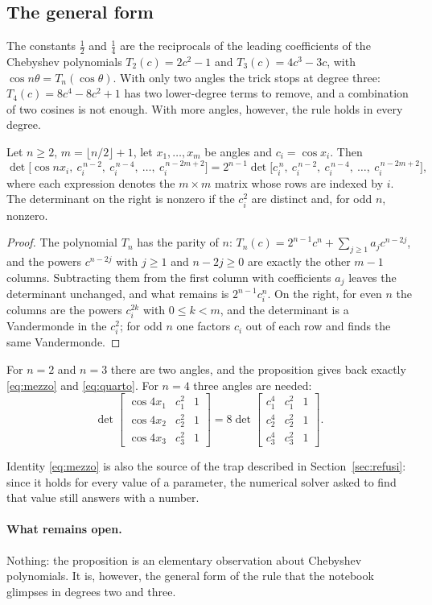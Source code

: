 \subsection{The general form}

The constants $\tfrac12$ and $\tfrac14$ are the reciprocals of the leading
coefficients of the Chebyshev polynomials $T_2(c)=2c^2-1$ and $T_3(c)=4c^3-3c$,
with $\cos n\theta=T_n(\cos\theta)$. With only two angles the trick stops at
degree three: $T_4(c)=8c^4-8c^2+1$ has two lower-degree terms to remove, and a
combination of two cosines is not enough. With more angles, however, the rule
holds in every degree.

\begin{prop}\label{prop:chebyshev}
Let $n\ge2$, $m=\lfloor n/2\rfloor+1$, let $x_1,\dots,x_m$ be angles and
$c_i=\cos x_i$. Then
\[
  \det\bigl[\cos nx_i,\ c_i^{\,n-2},\ c_i^{\,n-4},\ \dots,\ c_i^{\,n-2m+2}\bigr]
  =2^{n-1}\det\bigl[c_i^{\,n},\ c_i^{\,n-2},\ c_i^{\,n-4},\ \dots,\ c_i^{\,n-2m+2}\bigr],
\]
where each expression denotes the $m\times m$ matrix whose rows are indexed by
$i$. The determinant on the right is nonzero if the $c_i^2$ are distinct and,
for odd $n$, nonzero.
\end{prop}

\begin{proof}
The polynomial $T_n$ has the parity of $n$:
$T_n(c)=2^{n-1}c^n+\sum_{j\ge1}a_jc^{n-2j}$, and the powers $c^{n-2j}$ with
$j\ge1$ and $n-2j\ge0$ are exactly the other $m-1$ columns. Subtracting them
from the first column with coefficients $a_j$ leaves the determinant unchanged,
and what remains is $2^{n-1}c_i^n$. On the right, for even $n$ the columns are
the powers $c_i^{2k}$ with $0\le k<m$, and the determinant is a Vandermonde in
the $c_i^2$; for odd $n$ one factors $c_i$ out of each row and finds the same
Vandermonde.
\end{proof}

For $n=2$ and $n=3$ there are two angles, and the proposition gives back
exactly \eqref{eq:mezzo} and \eqref{eq:quarto}. For $n=4$ three angles are
needed:
\[
  \det\begin{bmatrix}
    \cos4x_1 & c_1^2 & 1\\
    \cos4x_2 & c_2^2 & 1\\
    \cos4x_3 & c_3^2 & 1
  \end{bmatrix}
  =8\det\begin{bmatrix}
    c_1^4 & c_1^2 & 1\\
    c_2^4 & c_2^2 & 1\\
    c_3^4 & c_3^2 & 1
  \end{bmatrix}.
\]

Identity \eqref{eq:mezzo} is also the source of the trap described in
Section~\ref{sec:refusi}: since it holds for every value of a parameter, the
numerical solver asked to find that value still answers with a number.

\paragraph{What remains open.}
Nothing: the proposition is an elementary observation about Chebyshev
polynomials. It is, however, the general form of the rule that the notebook
glimpses in degrees two and three.
